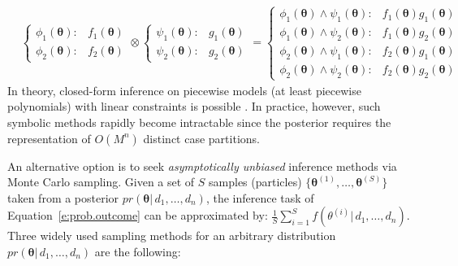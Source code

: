 {\footnotesize
\begin{align}
&\begin{cases}
\phi_1(\boldsymbol{\theta}) : &\!\!\!\!\! f_1(\boldsymbol{\theta})\\
\phi_2(\boldsymbol{\theta}) : &\!\!\!\!\! f_2(\boldsymbol{\theta})
\end{cases}
\otimes
\begin{cases}
\psi_1(\boldsymbol{\theta}) : &\!\!\!\!\! g_1(\boldsymbol{\theta})\\
\psi_2(\boldsymbol{\theta}) : &\!\!\!\!\! g_2(\boldsymbol{\theta})
\end{cases}
\!\!\!=\!\!
\begin{cases}
\phi_1(\boldsymbol{\theta}) \wedge \psi_1(\boldsymbol{\theta}) :\!\!\!\!\! & f_1(\boldsymbol{\theta}) g_1(\boldsymbol{\theta})\\
\phi_1(\boldsymbol{\theta}) \wedge \psi_2(\boldsymbol{\theta}) :\!\!\!\!\! & f_1(\boldsymbol{\theta}) g_2(\boldsymbol{\theta})\\
\phi_2(\boldsymbol{\theta}) \wedge \psi_1(\boldsymbol{\theta}) :\!\!\!\!\! & f_2(\boldsymbol{\theta}) g_1(\boldsymbol{\theta})\\
\phi_2(\boldsymbol{\theta}) \wedge \psi_2(\boldsymbol{\theta}) :\!\!\!\!\! & f_2(\boldsymbol{\theta}) g_2(\boldsymbol{\theta})
\end{cases}
\end{align}
}%
 In theory, closed-form inference on piecewise models (at least piecewise polynomials) with linear constraints is possible \cite{Sanner:12}.
In practice, however, such symbolic methods rapidly become intractable since the posterior requires
the representation of $O(M^n)$ distinct case partitions.
   
An alternative option is to seek \emph{asymptotically unbiased} inference methods
via Monte Carlo sampling.
Given a set of $S$ samples (particles) $\{\boldsymbol\theta^{(1)}, \ldots, \boldsymbol\theta^{(S)}\}$ taken from a posterior $pr(\boldsymbol\theta | \, d_1, \ldots, d_n)$, 
the inference task of Equation~\ref{e:prob.outcome} can be approximated by: 
$\frac{1}{S} \sum_{i=1}^S f(\theta^{(i)} | \, d_1, \ldots, d_n)$.
Three widely used sampling methods for an arbitrary distribution $pr(\boldsymbol\theta | \, d_1, \ldots, d_n)$ are the following:


